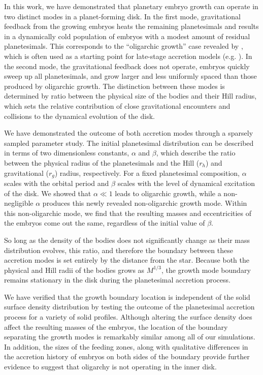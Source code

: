 \documentclass[twocolumn]{aastex63}
\begin{document}
In this work, we have demonstrated that planetary embryo growth
can operate in two distinct modes in a planet-forming disk. In the first
mode, gravitational feedback from the growing embryos heats the
remaining planetesimals and results in a dynamically cold population
of embryos with a modest amount of residual planetesimals. This
corresponds to the ``oligarchic growth'' case revealed by \citep{kokubo98}, which is often used as a starting point for late-stage accretion models (e.g. \citet{kokubo02, raymond05, raymond06}). In the second mode, the gravitational feedback does not operate, embryos quickly sweep up all planetesimals, and grow larger and less uniformly spaced than those produced by oligarchic growth. The distinction between these modes is determined by ratio between the physical size of the bodies and their Hill radius, which sets the relative contribution of close gravitational encounters and collisions to the dynamical evolution of the disk.

We have demonstrated the outcome of both accretion modes through a
sparsely sampled parameter study. The initial planetesimal distribution can be described in terms of two dimensionless constants, $\alpha$ and $\beta$, which describe the ratio between the physical radius of the planetesimals and the Hill ($r_{h}$) and gravitational ($r_{g}$) radius, respectively. For a fixed planetesimal composition, $\alpha$ scales with the orbital period and $\beta$ scales with the level of dynamical excitation of the disk. We showed that $\alpha \ll 1$ leads to oligarchic growth, while a non-negligible $\alpha$ produces this newly revealed non-oligarchic growth mode. Within this non-oligarchic mode, we find that the resulting masses and eccentricities of the embryos come out the same, regardless of the initial value of $\beta$.

So long as the density of the bodies does not significantly change as
their mass distribution evolves, this ratio, and therefore the
boundary between these accretion modes is set entirely by the distance
from the star. Because both the physical and Hill radii of the bodies
grows as $M^{1/3}$, the growth mode boundary remains stationary
 in the disk during the planetesimal accretion process.
 
We have verified that the growth boundary location is independent of the
solid surface density distribution by testing the outcome of the planetesimal
accretion process for a variety of solid
profiles. Although altering the surface density does affect the
resulting masses of the embryos, the location of the boundary
separating the growth modes is remarkably similar among all of our simulations.
In addition, the sizes of the feeding zones, along with qualitative differences in the
accretion history of embryos on both sides of the boundary provide further evidence to
suggest that oligarchy is not operating in the inner disk.
\end{document}
